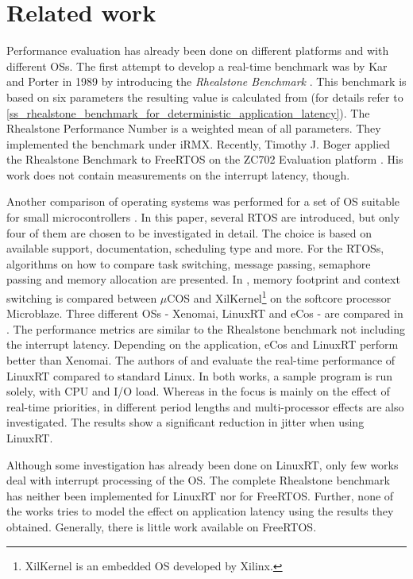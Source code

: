 \section{Related work}
Performance evaluation has already been done on different platforms and with different \acp{OS}. 
The first attempt to develop a real-time benchmark was by Kar and Porter in 1989 by introducing the \textit{Rhealstone Benchmark} \cite{kar:itrb} \cite{kar:artbp}. 
This benchmark is based on six parameters the resulting value is calculated from (for details refer to \ref{ss_rhealstone_benchmark_for_deterministic_application_latency}).
The Rhealstone Performance Number is a weighted mean of all parameters. 
They implemented the benchmark under iRMX.
Recently, Timothy J. Boger applied the Rhealstone Benchmark to FreeRTOS on the ZC702 Evaluation platform \cite{boger:rbofatxzepp}.
His work does not contain measurements on the interrupt latency, though.
\par
Another comparison of operating systems was performed for a set of \ac{OS} suitable for small microcontrollers \cite{Anh:sapeortosfsm}. 
In this paper, several \ac{RTOS} are introduced, but only four of them are chosen to be investigated in detail.
The choice is based on available support, documentation, scheduling type and more. 
For the \acp{RTOS}, algorithms on how to compare task switching, message passing, semaphore passing and memory allocation are presented.  
In \cite{gokhan:cstamfcoxamom}, memory footprint and context switching is compared between $\mu$COS and XilKernel\footnote{XilKernel \cite{xilinx:xilkernel} is an embedded \ac{OS} developed by Xilinx.} on the softcore processor Microblaze.
Three different \acp{OS} - Xenomai, LinuxRT and eCos \cite{ecos} - are compared in \cite{Marieska:opokbaertosbaa}.
The performance metrics are similar to the Rhealstone benchmark not including the interrupt latency.
Depending on the application, eCos and LinuxRT perform better than Xenomai.
The authors of \cite{cereia:peoaemulatrp} and \cite{betz:eeotlrpfrta} evaluate the real-time performance of LinuxRT compared to standard Linux.
In both works, a sample program is run solely, with CPU and I/O load. 
Whereas in \cite{cereia:peoaemulatrp} the focus is mainly on the effect of real-time priorities, in \cite{betz:eeotlrpfrta} different period lengths and multi-processor effects are also investigated. 
The results show a significant reduction in jitter when using LinuxRT.
\par
Although some investigation has already been done on LinuxRT, only few works deal with interrupt processing of the \ac{OS}.
The complete Rhealstone benchmark has neither been implemented for LinuxRT nor for FreeRTOS.
Further, none of the works tries to model the effect on application latency using the results they obtained.
Generally, there is little work available on FreeRTOS.

